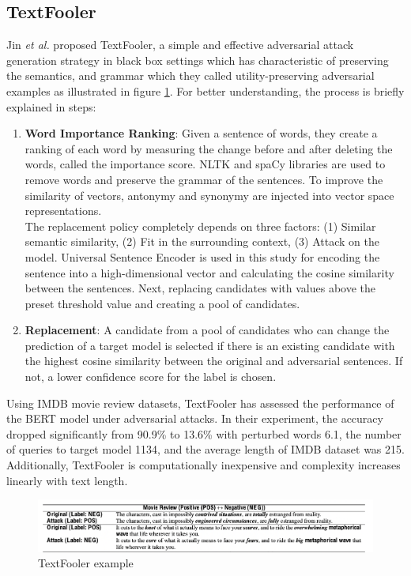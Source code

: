 \documentclass[%
	BCOR=8mm, %
	DIV=12,
	toc=bibliography, %
	toc=listof, %
	oneside, %
	egregdoesnotlikesansseriftitles, %
	]{scrbook}
\begin{document}
\subsection{TextFooler}
\label{subsection:textfooler}
Jin \textit{et al.} \cite{jin_is_2020-1} proposed TextFooler, a simple and effective adversarial attack generation strategy in black box settings which has characteristic of preserving the semantics, and grammar which they called utility-preserving adversarial examples as illustrated in figure \ref{diag:TextFoolerExp}. For better understanding, the process is briefly explained in steps:
\begin{enumerate}
    \item  \textbf{Word Importance Ranking}: Given a sentence of words, they create a ranking of each word by measuring the change before and after deleting the words, called the importance score. NLTK and spaCy libraries are used to remove words and preserve the grammar of the sentences. To improve the similarity of vectors, antonymy and synonymy are injected into vector space representations.\\
    The replacement policy completely depends on three factors: (1) Similar semantic similarity, (2) Fit in the surrounding context, (3) Attack on the model. Universal Sentence Encoder \cite{cer_universal_2018} is used in this study for encoding the sentence into a high-dimensional vector and calculating the cosine similarity between the sentences. Next, replacing candidates with values above the preset threshold value and creating a pool of candidates.
    \item \textbf{Replacement}: A candidate from a pool of candidates who can change the prediction of a target model is selected if there is an existing candidate with the highest cosine similarity between the original and adversarial sentences. If not, a lower confidence score for the label is chosen.
\end{enumerate}
Using IMDB movie review datasets, TextFooler has assessed the performance of the BERT model under adversarial attacks. In their experiment, the accuracy dropped significantly from 90.9\% to 13.6\% with perturbed words 6.1, the number of queries to target model 1134, and the average length of IMDB dataset was 215. Additionally, TextFooler is computationally inexpensive and complexity increases linearly with text length. 
\begin{figure}[H]
    \centering
    \includegraphics[width=1.0\textwidth]{img/textfooler_example.png}
    \caption[Example of TextFooler]{TextFooler example  \cite{jia_certified_2019} }
    \label{diag:TextFoolerExp}
\end{figure}
\end{document}
